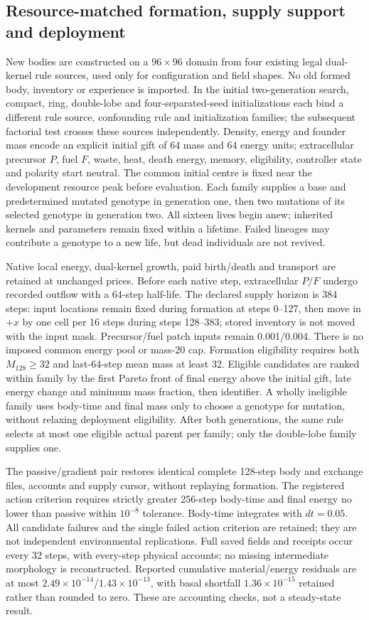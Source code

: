 \subsection*{Resource-matched formation, supply support and deployment}
New bodies are constructed on a $96\times96$ domain from four existing legal dual-kernel rule sources, used only for configuration and field shapes. No old formed body, inventory or experience is imported. In the initial two-generation search, compact, ring, double-lobe and four-separated-seed initializations each bind a different rule source, confounding rule and initialization families; the subsequent factorial test crosses these sources independently. Density, energy and founder mass encode an explicit initial gift of 64 mass and 64 energy units; extracellular precursor $P$, fuel $F$, waste, heat, death energy, memory, eligibility, controller state and polarity start neutral. The common initial centre is fixed near the development resource peak before evaluation. Each family supplies a base and predetermined mutated genotype in generation one, then two mutations of its selected genotype in generation two. All sixteen lives begin anew; inherited kernels and parameters remain fixed within a lifetime. Failed lineages may contribute a genotype to a new life, but dead individuals are not revived.

Native local energy, dual-kernel growth, paid birth/death and transport are retained at unchanged prices. Before each native step, extracellular $P/F$ undergo recorded outflow with a 64-step half-life. The declared supply horizon is 384 steps: input locations remain fixed during formation at steps 0--127, then move in $+x$ by one cell per 16 steps during steps 128--383; stored inventory is not moved with the input mask. Precursor/fuel patch inputs remain 0.001/0.004. There is no imposed common energy pool or mass-20 cap. Formation eligibility requires both $M_{128}\geq32$ and last-64-step mean mass at least 32. Eligible candidates are ranked within family by the first Pareto front of final energy above the initial gift, late energy change and minimum mass fraction, then identifier. A wholly ineligible family uses body-time and final mass only to choose a genotype for mutation, without relaxing deployment eligibility. After both generations, the same rule selects at most one eligible actual parent per family; only the double-lobe family supplies one.

The passive/gradient pair restores identical complete 128-step body and exchange files, accounts and supply cursor, without replaying formation. The registered action criterion requires strictly greater 256-step body-time and final energy no lower than passive within $10^{-8}$ tolerance. Body-time integrates with $dt=0.05$. All candidate failures and the single failed action criterion are retained; they are not independent environmental replications. Full saved fields and receipts occur every 32 steps, with every-step physical accounts; no missing intermediate morphology is reconstructed. Reported cumulative material/energy residuals are at most $2.49\times10^{-14}$/$1.43\times10^{-13}$, with basal shortfall $1.36\times10^{-15}$ retained rather than rounded to zero. These are accounting checks, not a steady-state result.

